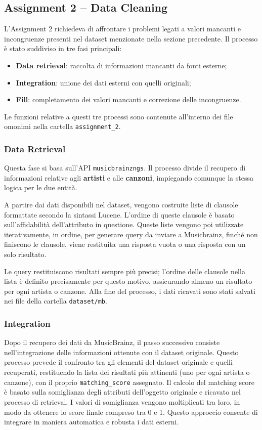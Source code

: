 \subsection*{Assignment 2 -- Data Cleaning}
L'Assignment 2 richiedeva di affrontare i problemi legati a valori
mancanti e incongruenze presenti nel dataset menzionate nella sezione
precedente.
Il processo è stato suddiviso in tre fasi principali:
\begin{itemize}
    \item \textbf{Data retrieval}: raccolta di informazioni mancanti da
    fonti esterne;
    \item \textbf{Integration}: unione dei dati esterni con quelli
    originali;
    \item \textbf{Fill}: completamento dei valori mancanti e
    correzione delle incongruenze.
\end{itemize}

Le funzioni relative a questi tre processi sono contenute all'interno
dei file omonimi nella cartella \texttt{assignment\_2}.

\subsubsection*{Data Retrieval}
Questa fase si basa sull'API \texttt{musicbrainzngs}.
Il processo divide il recupero di informazioni
relative agli \textbf{artisti} e alle \textbf{canzoni}, impiegando
comunque la stessa logica per le due entità.

A partire dai dati disponibili nel dataset, vengono costruite liste di
clausole formattate secondo la sintassi Lucene.
L'ordine di queste clausole è basato sull'affidabilità dell'attributo in
questione. Queste liste vengono poi utilizzate iterativamente, in ordine,
per generare query da inviare a Musicbrainz, finché non finiscono
le clausole, viene restituita una risposta vuota o una risposta con un
solo risultato.

Le query restituiscono risultati sempre più precisi; l'ordine delle clausole
nella lista è definito precisamente per questo motivo,
assicurando almeno un risultato per ogni artista o canzone.
Alla fine del processo, i dati ricavati sono stati salvati nei file della
cartella \texttt{dataset/mb}.


\subsubsection*{Integration}
Dopo il recupero dei dati da MusicBrainz, il passo successivo consiste
nell'integrazione delle informazioni ottenute con il dataset
originale.
Questo processo prevede il confronto tra gli elementi del dataset
originale e quelli recuperati, restituendo la lista dei risultati
più attinenti (uno per ogni artista o canzone),
con il proprio \texttt{matching\_score}
assegnato. Il calcolo del matching score è basato sulla somiglianza
degli attributi dell'oggetto originale e ricavato nel processo di
retrieval.
I valori di somiglianza vengono moltiplicati tra loro, in modo da
ottenere lo score finale compreso tra 0 e 1.
Questo approccio consente di integrare in maniera automatica e robusta
i dati esterni.


